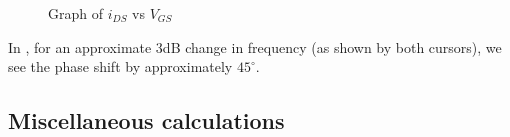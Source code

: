 \documentclass[titlepage]{article}
\begin{document}
\begin{figure}[ht]
    \centering
    \caption{Graph of $i_{DS}$ vs $V_{GS}$}
    \label{fig:i_vs_vgs}
\end{figure}

In , for an approximate 3dB change in frequency (as shown by both cursors), we see the phase shift by approximately $45^{\circ}$.

\newpage
\subsection{Miscellaneous calculations}
\end{document}
